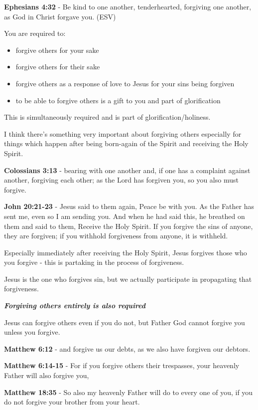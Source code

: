 \documentclass[11pt]{article}
\begin{document}
\textbf{Ephesians 4:32} - Be kind to one another, tenderhearted, forgiving one another, as God in Christ forgave you. (ESV)

You are required to:
\begin{itemize}
\item forgive others for your sake
\item forgive others for their sake
\item forgive others as a response of love to Jesus for your sins being forgiven
\item to be able to forgive others is a gift to you and part of glorification
\end{itemize}

This is simultaneously required and is part of glorification/holiness.

I think there's something very important about forgiving others especially for things which happen after being born-again of the Spirit and receiving the Holy Spirit.

\textbf{Colossians 3:13} - bearing with one another and, if one has a complaint against another, forgiving each other; as the Lord has forgiven you, so you also must forgive.

\textbf{John 20:21-23} - Jesus said to them again, Peace be with you. As the Father has sent me, even so I am sending you. And when he had said this, he breathed on them and said to them, Receive the Holy Spirit. If you forgive the sins of anyone, they are forgiven; if you withhold forgiveness from anyone, it is withheld.

Especially immediately after receiving the Holy Spirit, Jesus forgives those who you forgive - this is partaking in the process of forgiveness.

Jesus is the one who forgives sin, but we actually participate in propagating that forgiveness.

\emph{\textbf{Forgiving others entirely is also required}}

Jesus can forgive others even if you do not, but Father God cannot forgive you unless you forgive.

\textbf{Matthew 6:12} - and forgive us our debts, as we also have forgiven our debtors.

\textbf{Matthew 6:14-15} - For if you forgive others their trespasses, your heavenly Father will also forgive you,

\textbf{Matthew 18:35} - So also my heavenly Father will do to every one of you, if you do not forgive your brother from your heart.
\end{document}
